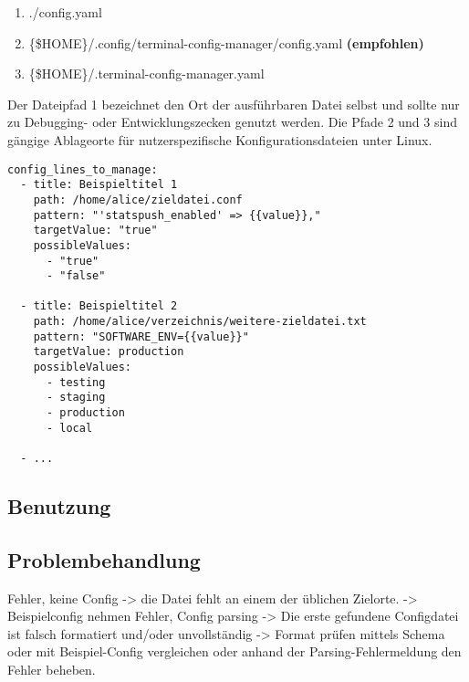 \documentclass[a4paper,11pt]{scrartcl} %
\begin{document}
\begin{enumerate}
	\item ./config.yaml
	\item \{\$HOME\}/.config/terminal-config-manager/config.yaml \textbf{(empfohlen)}
	\item \{\$HOME\}/.terminal-config-manager.yaml
\end{enumerate}

Der Dateipfad 1 bezeichnet den Ort der ausführbaren Datei selbst und sollte nur
zu Debugging- oder Entwicklungszecken genutzt werden. Die Pfade 2 und 3 sind
gängige Ablageorte für nutzerspezifische Konfigurationsdateien unter Linux.

\begin{verbatim}
config_lines_to_manage:
  - title: Beispieltitel 1
    path: /home/alice/zieldatei.conf
    pattern: "'statspush_enabled' => {{value}},"
    targetValue: "true"
    possibleValues:
      - "true"
      - "false"

  - title: Beispieltitel 2
    path: /home/alice/verzeichnis/weitere-zieldatei.txt
    pattern: "SOFTWARE_ENV={{value}}"
    targetValue: production
    possibleValues:
      - testing
      - staging
      - production
      - local

  - ...
\end{verbatim}

\subsection{Benutzung}

\subsection{Problembehandlung}
Fehler, keine Config -> die Datei fehlt an einem der üblichen Zielorte.
-> Beispielconfig nehmen
Fehler, Config parsing -> Die erste gefundene Configdatei ist falsch
formatiert und/oder unvollständig -> Format prüfen mittels Schema
oder mit Beispiel-Config vergleichen oder anhand der Parsing-Fehlermeldung
den Fehler beheben.
\end{document}
